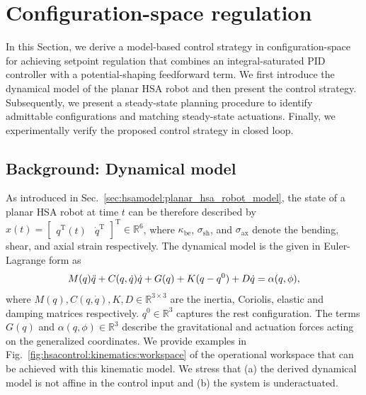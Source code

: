 \section{Configuration-space regulation}\label{sec:hsacontrol:configuration_space_regulation}
In this Section, we derive a model-based control strategy in configuration-space for achieving setpoint regulation that combines an integral-saturated PID controller with a potential-shaping feedforward term. We first introduce the dynamical model of the planar \gls{HSA} robot and then present the control strategy.
Subsequently, we present a steady-state planning procedure to identify admittable configurations and matching steady-state actuations.
Finally, we experimentally verify the proposed control strategy in closed loop.

\subsection{Background: Dynamical model}\label{sub:hsacontrol:model}
As introduced in Sec.~\ref{sec:hsamodel:planar_hsa_robot_model}, the state of a planar \gls{HSA} robot at time $t$ can be therefore described by $x(t) = \begin{bmatrix}
    q^\mathrm{T}(t) & \dot{q}^\mathrm{T}
\end{bmatrix}^\mathrm{T} \in \mathbb{R}^6$, where $\kappa_\mathrm{be}$, $\sigma_\mathrm{sh}$, and $\sigma_\mathrm{ax}$ denote the bending, shear, and axial strain respectively.
The dynamical model is the given in Euler-Lagrange form as
\begin{equation}\label{eq:hsacontrol:dynamics}
    M(q) \Ddot{q} + C(q,\dot{q})\dot{q} + G(q) + K (q - q^0) + D \dot{q} = \alpha(q,\phi),
\end{equation}
where $M(q),C(q,\dot{q}),K,D \in \mathbb{R}^{3 \times 3}$ are the inertia, Coriolis, elastic and damping matrices respectively. $q^0 \in \mathbb{R}^3$ captures the rest configuration. The terms $G(q)$ and $\alpha(q,\phi) \in \mathbb{R}^3$ describe the gravitational and actuation forces acting on the generalized coordinates.
We provide examples in Fig.~\ref{fig:hsacontrol:kinematics:workspace} of the operational workspace that can be achieved with this kinematic model.
We stress that (a) the derived dynamical model is not affine in the control input and (b) the system is underactuated.

